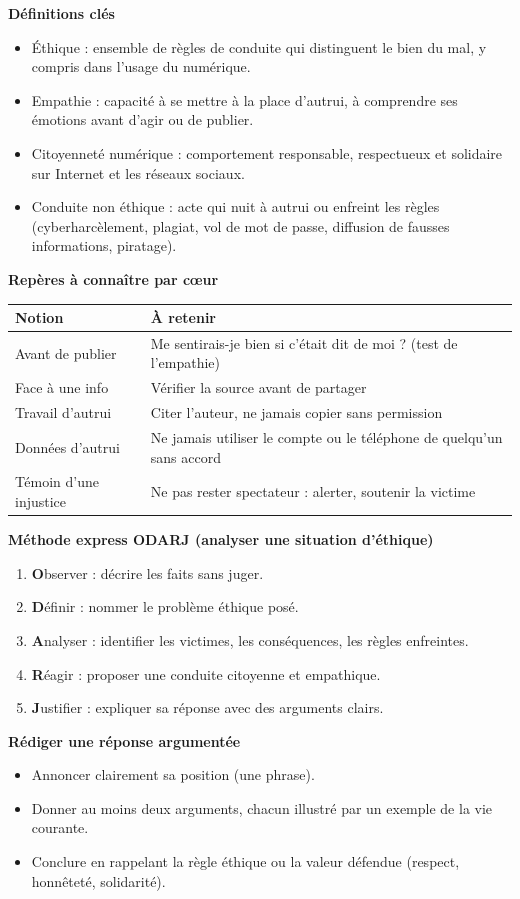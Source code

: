 \documentclass[11pt]{article}
\newcommand{\cle}[1]{{\popxbold\color{popdark}#1}}
\begin{document}
\begin{bilan}
\textbf{Définitions clés}
\begin{itemize}
  \item \cle{Éthique} : ensemble de règles de conduite qui distinguent le bien du mal, y compris dans l'usage du numérique.
  \item \cle{Empathie} : capacité à se mettre à la place d'autrui, à comprendre ses émotions avant d'agir ou de publier.
  \item \cle{Citoyenneté numérique} : comportement responsable, respectueux et solidaire sur Internet et les réseaux sociaux.
  \item \cle{Conduite non éthique} : acte qui nuit à autrui ou enfreint les règles (cyberharcèlement, plagiat, vol de mot de passe, diffusion de fausses informations, piratage).
\end{itemize}

\textbf{Repères à connaître par c\oe ur}
\begin{center}
\begin{tabularx}{\linewidth}{|l|X|}
\hline
\rowcolor{popblueL} \textbf{Notion} & \textbf{À retenir} \\
\hline
Avant de publier & Me sentirais-je bien si c'était dit de moi ? (test de l'empathie) \\
\hline
Face à une info & Vérifier la source avant de partager \\
\hline
Travail d'autrui & Citer l'auteur, ne jamais copier sans permission \\
\hline
Données d'autrui & Ne jamais utiliser le compte ou le téléphone de quelqu'un sans accord \\
\hline
Témoin d'une injustice & Ne pas rester spectateur : alerter, soutenir la victime \\
\hline
\end{tabularx}
\end{center}

\textbf{Méthode express ODARJ (analyser une situation d'éthique)}
\begin{enumerate}
  \item \textbf{O}bserver : décrire les faits sans juger.
  \item \textbf{D}éfinir : nommer le problème éthique posé.
  \item \textbf{A}nalyser : identifier les victimes, les conséquences, les règles enfreintes.
  \item \textbf{R}éagir : proposer une conduite citoyenne et empathique.
  \item \textbf{J}ustifier : expliquer sa réponse avec des arguments clairs.
\end{enumerate}

\textbf{Rédiger une réponse argumentée}
\begin{itemize}
  \item Annoncer clairement sa position (une phrase).
  \item Donner au moins deux arguments, chacun illustré par un exemple de la vie courante.
  \item Conclure en rappelant la règle éthique ou la valeur défendue (respect, honnêteté, solidarité).
\end{itemize}
\end{bilan}
\end{document}
